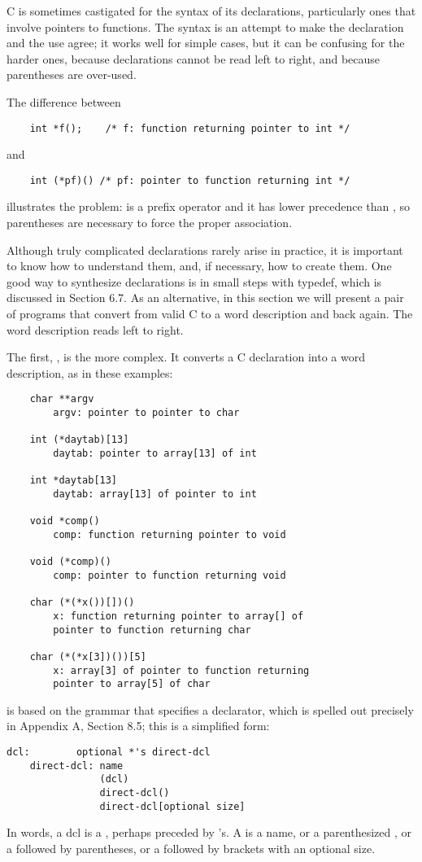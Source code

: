 C is sometimes castigated for the syntax of its declarations, particularly ones that involve pointers to functions.
The syntax is an attempt to make the declaration and the use agree;
it works well for simple cases, but it can be confusing for the harder ones, because declarations cannot be read left to right, and because parentheses are over-used.

The difference between
\begin{lstlisting}
    int *f();    /* f: function returning pointer to int */
\end{lstlisting}
and
\begin{lstlisting}
    int (*pf)() /* pf: pointer to function returning int */
\end{lstlisting}
illustrates the problem: \code{*} is a prefix operator and it has lower precedence than \code{()}, so parentheses are necessary to force the proper association.

Although truly complicated declarations rarely arise in practice, it is important to know how to understand them, and, if necessary, how to create them.
One good way to synthesize declarations is in small steps with typedef, which is discussed in Section 6.7.
As an alternative, in this section we will present a pair of programs that convert from valid C to a word description and back again.
The word description reads left to right.

The first, , is the more complex. It converts a C declaration into a word description, as in these examples:

\begin{lstlisting}
    char **argv
        argv: pointer to pointer to char

    int (*daytab)[13]
        daytab: pointer to array[13] of int

    int *daytab[13]
        daytab: array[13] of pointer to int

    void *comp()
        comp: function returning pointer to void

    void (*comp)()
        comp: pointer to function returning void

    char (*(*x())[])()
        x: function returning pointer to array[] of
        pointer to function returning char

    char (*(*x[3])())[5]
        x: array[3] of pointer to function returning
        pointer to array[5] of char
\end{lstlisting}

 is based on the grammar that specifies a declarator, which is spelled out precisely in Appendix A, Section 8.5; this is a simplified form:
\begin{lstlisting}[frameround=tttt,frame=none,stringstyle=\color{black}]
    dcl:        optional *'s direct-dcl
    direct-dcl: name
                (dcl)
                direct-dcl()
                direct-dcl[optional size]
\end{lstlisting}
In words, a dcl is a , perhaps preceded by \code{*}'s. A  is a name, or a parenthesized , or a  followed by parentheses, or a  followed by brackets with an optional size.

